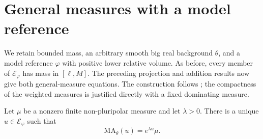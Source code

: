 \section{General measures with a model reference}
\label{sec:big-model-general-measures}

We retain bounded mass, an arbitrary smooth big real background $\theta$, and a model reference $\varphi$ with positive lower relative volume. As before, every member of $\mathcal E_\varphi$ has mass in $[\ell,M]$. The preceding projection and addition results now give both general-measure equations. The construction follows \cite[Theorems 6.1--6.2]{XL26}; the compactness of the weighted measures is justified directly with a fixed dominating measure.

\begin{theorem}\label{thm:big-model-exponential}
Let $\mu$ be a nonzero finite non-pluripolar measure and let $\lambda>0$. There is a unique $u\in\mathcal E_\varphi$ such that
\[
 \mathrm{MA}_\theta(u)=e^{\lambda u}\mu.
\]
\end{theorem}
